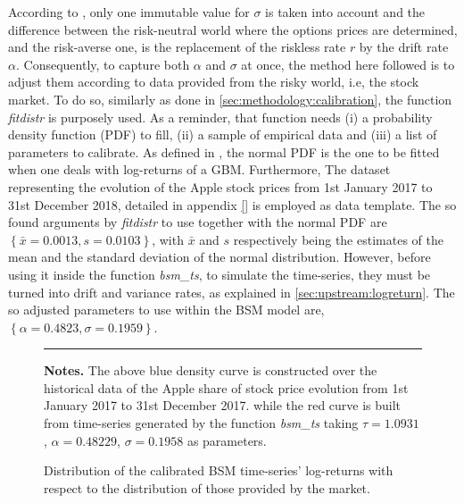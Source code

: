 \documentclass[12pt]{report}
\begin{document}
According to \citet{bs}, only one immutable value for $\sigma$ is taken into account and the difference between the risk-neutral world where the options prices are determined, and the risk-averse one, is the replacement of the riskless rate $r$ by the drift rate $\alpha$.
Consequently, to capture both $\alpha$ and $\sigma$ at once, the method here followed is to adjust them according to data provided from the risky world, i.e, the stock market.
To do so, similarly as done in \cref{sec:methodology:calibration}, the function \textit{fitdistr} is purposely used.
As a reminder, that function needs (i) a probability density function (PDF) to fill, (ii) a sample of empirical data and (iii) a list of parameters to calibrate.
As defined in \citet{bs}, the normal  PDF is the one to be fitted when one deals with log-returns of a GBM.
Furthermore, The dataset representing the evolution of the Apple stock prices from 1st January 2017 to 31st December 2018, detailed in appendix \cref{} is employed as data template.
The so found arguments by \textit{fitdistr} to use together with the normal PDF are $\left\{ \bar{x} = 0.0013, s = 0.0103 \right\}$, with $\bar{x}$ and $s$ respectively being the estimates of the mean and the standard deviation of the normal distribution.
However, before using it inside the function \textit{bsm\_ts}, to simulate the time-series, they must be turned into drift and variance rates, as explained in \cref{sec:upstream:logreturn}.
The so adjusted parameters to use within the BSM model are, $\left\{ \alpha = 0.4823, \sigma = 0.1959  \right\}$.

\begin{figure}[h]
  \centering
  \rule{40mm}{20mm}
  \caption{Distribution of the calibrated BSM time-series' log-returns with respect to the distribution of those provided by the market.}
  \begin{changemargin}{0.5cm}{0.5cm}
  \medskip
\footnotesize
{}\textbf{Notes.} The above blue density curve is constructed over the historical data of the Apple share of stock price evolution from 1st January 2017 to 31st December 2017. while the red curve is built from time-series generated by the function \textit{bsm\_ts} taking $\tau = 1.0931$, $\alpha = 0.48229$, $\sigma = 0.1958$ as parameters.
  \end{changemargin}
  \label{p:analysis:gbm:adjusted}
\end{figure}
\end{document}
